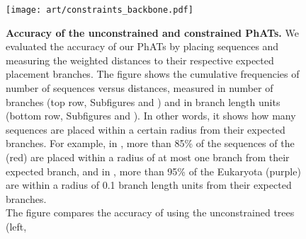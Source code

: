 \begin{figure}[hpbt]
    \centering
    \texttt{[image: art/constraints\_backbone.pdf]}
    \begin{subfigure}{0pt}
        \label{fig:constraints_backbone:sub:edge_unconstr}
    \end{subfigure}
    \begin{subfigure}{0pt}
        \label{fig:constraints_backbone:sub:edge_constr}
    \end{subfigure}
    \begin{subfigure}{0pt}
        \label{fig:constraints_backbone:sub:branch_unconstr}
    \end{subfigure}
    \begin{subfigure}{0pt}
        \label{fig:constraints_backbone:sub:branch_constr}
    \end{subfigure}
    \caption[Accuracy of the unconstrained and constrained \acsp{PhAT}]{
        \textbf{Accuracy of the unconstrained and constrained \acfp{PhAT}.}
        We evaluated the accuracy of our \acp{PhAT} by placing sequences
        and measuring the weighted distances to their respective expected placement branches.
        The figure shows the cumulative frequencies of number of sequences versus distances,
        measured in number of branches (top row, Subfigures  and
        )
        and in branch length units (bottom row, Subfigures  and
        ).
        In other words, it shows how many sequences are placed
        within a certain radius from their expected branches.
        For example, in ,
        more than 85\% of the sequences of the  (red) are placed
        within a radius of at most one branch from their expected branch,
        and in , more than 95\% of the Eukaryota (purple) are
        within a radius of 0.1 branch length units from their expected branches.
        \\
        The figure compares the accuracy of using the unconstrained trees (left,
}
\end{figure}
